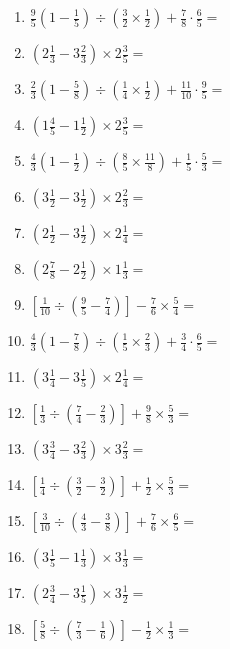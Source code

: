 \documentclass[12pt]{article}
\begin{document}
\begin{enumerate}[ itemsep=1.5cm]
	\item $\displaystyle \frac{9}{5} \left( 1 - \frac{1}{5} \right) \div \left( \frac{3}{2} \times \frac{1}{2} \right) + \frac{7}{8} \cdot \frac{6}{5} =$
	\item $\displaystyle \left( 2 \frac{1}{3} - 3 \frac{2}{3} \right) \times 2 \frac{3}{5} =$
	\item $\displaystyle \frac{2}{3} \left( 1 - \frac{5}{8} \right) \div \left( \frac{1}{4} \times \frac{1}{2} \right) + \frac{11}{10} \cdot \frac{9}{5} =$
	\item $\displaystyle \left( 1 \frac{4}{5} - 1 \frac{1}{2} \right) \times 2 \frac{3}{5} =$
	\item $\displaystyle \frac{4}{3} \left( 1 - \frac{1}{2} \right) \div \left( \frac{8}{5} \times \frac{11}{8} \right) + \frac{1}{5} \cdot \frac{5}{3} =$
	\item $\displaystyle \left( 3 \frac{1}{2} - 3 \frac{1}{2} \right) \times 2 \frac{2}{3} =$
	\item $\displaystyle \left( 2 \frac{1}{2} - 3 \frac{1}{2} \right) \times 2 \frac{1}{4} =$
	\item $\displaystyle \left( 2 \frac{7}{8} - 2 \frac{1}{2} \right) \times 1 \frac{1}{3} =$
	\item $\displaystyle \left[ \frac{1}{10} \div \left( \frac{9}{5} - \frac{7}{4} \right) \right] - \frac{7}{6} \times \frac{5}{4} =$

	\item $\displaystyle \frac{4}{3} \left( 1 - \frac{7}{8} \right) \div \left( \frac{1}{5} \times \frac{2}{3} \right) + \frac{3}{4} \cdot \frac{6}{5} =$
	\item $\displaystyle \left( 3 \frac{1}{4} - 3 \frac{1}{5} \right) \times 2 \frac{1}{4} =$
	\item $\displaystyle \left[ \frac{1}{3} \div \left( \frac{7}{4} - \frac{2}{3} \right) \right] + \frac{9}{8} \times \frac{5}{3} =$
	\item $\displaystyle \left( 3 \frac{3}{4} - 3 \frac{2}{3} \right) \times 3 \frac{2}{3} =$
	\item $\displaystyle \left[ \frac{1}{4} \div \left( \frac{3}{2} - \frac{3}{2} \right) \right] + \frac{1}{2} \times \frac{5}{3} =$
	\item $\displaystyle \left[ \frac{3}{10} \div \left( \frac{4}{3} - \frac{3}{8} \right) \right] + \frac{7}{6} \times \frac{6}{5} =$
	\item $\displaystyle \left( 3 \frac{1}{5} - 1 \frac{1}{3} \right) \times 3 \frac{1}{3} =$
	\item $\displaystyle \left( 2 \frac{3}{4} - 3 \frac{1}{5} \right) \times 3 \frac{1}{2} =$
	\item $\displaystyle \left[ \frac{5}{8} \div \left( \frac{7}{3} - \frac{1}{6} \right) \right] - \frac{1}{2} \times \frac{1}{3} =$


\end{enumerate}
\end{document}
